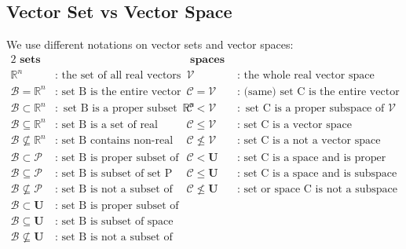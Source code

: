 \documentclass[11pt]{article}
\newcommand{\myvecsp}[1]{\bm{\mathcal{#1}}}
\newcommand{\mysubvecsp}[1]{\bm{{#1}}}
\newcommand{\myset}[1]{\mathcal{#1}}
\begin{document}
    \subsection{Vector Set vs Vector Space}
    We use different notations on vector sets and vector spaces: 
    \begin{alignat*}{2}
        \textbf{ sets } &
            & \textbf{ spaces } & \\[1em]
        \mathbb{R}^n&: \text{ the set of all real vectors } 
            & \myvecsp{V}&: \text{ the whole real vector space } \\
        \myset{B} = \mathbb{R}^n&: \text{ set B is the entire vector space } 
            & \myset{C} = \myvecsp{V}&: \text{ (same) set C is the entire vector space } \\
        \myset{B} \subset \mathbb{R}^n&: \text{ set B is a proper subset of }\mathbb{R}^n
            & \myset{C} < \myvecsp{V}&: \text{ set C is a proper subspace of }\myvecsp{V} \\
        \myset{B} \subseteq \mathbb{R}^n&: \text{ set B is a set of real vectors } 
            & \myset{C} \le \myvecsp{V}&: \text{ set C is a vector space } \\
        \myset{B} \nsubseteq \mathbb{R}^n&: \text{ set B contains non-real vectors } 
            & \myset{C} \not\le \myvecsp{V}&: \text{ set C is a not a vector space } \\
        \myset{B} \subset \myset{P}&: \text{ set B is proper subset of set P}
            & \myset{C} < \mysubvecsp{U}&: \text{ set C is a space and is proper subspace of U } \\
        \myset{B} \subseteq \myset{P}&: \text{ set B is subset of set P} 
            & \myset{C} \le \mysubvecsp{U}&: \text{ set C is a space and is subspace of U } \\
        \myset{B} \nsubseteq \myset{P}&: \text{ set B is not a subset of set P} 
            & \myset{C} \not\le \mysubvecsp{U}&: \text{ set or space C is not a subspace of U } \\
        \myset{B} \subset \mysubvecsp{U}&: \text{ set B is proper subset of space U} 
            & & \\
        \myset{B} \subseteq \mysubvecsp{U}&: \text{ set B is subset of space U} 
            & & \\
        \myset{B} \nsubseteq \mysubvecsp{U}&: \text{ set B is not a subset of space U} 
            & & \\
    \end{alignat*}
\end{document}
